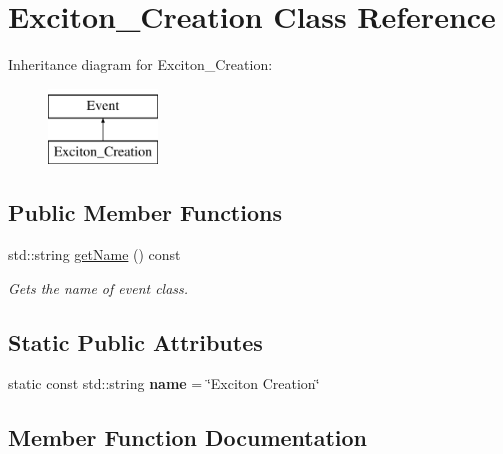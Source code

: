 \hypertarget{class_exciton___creation}{}\section{Exciton\+\_\+\+Creation Class Reference}
\label{class_exciton___creation}
Inheritance diagram for Exciton\+\_\+\+Creation\+:\begin{figure}[H]
\begin{center}
\leavevmode
\includegraphics[height=2.000000cm]{class_exciton___creation}
\end{center}
\end{figure}
\subsection*{Public Member Functions}
\begin{DoxyCompactItemize}
\item 
std\+::string \hyperlink{class_exciton___creation_aba92afc6c2aa48ce15c59c9e7310c636}{get\+Name} () const
\begin{DoxyCompactList}\small\item\em Gets the name of event class. \end{DoxyCompactList}\end{DoxyCompactItemize}
\subsection*{Static Public Attributes}
\begin{DoxyCompactItemize}
\item 
\mbox{\label{class_exciton___creation_a4e72153bdee28c070e978b871eac7c9c}} 
static const std\+::string {\bfseries name} = \char`\"{}Exciton Creation\char`\"{}
\end{DoxyCompactItemize}


\subsection{Member Function Documentation}
\mbox{\label{class_exciton___creation_aba92afc6c2aa48ce15c59c9e7310c636}} 
